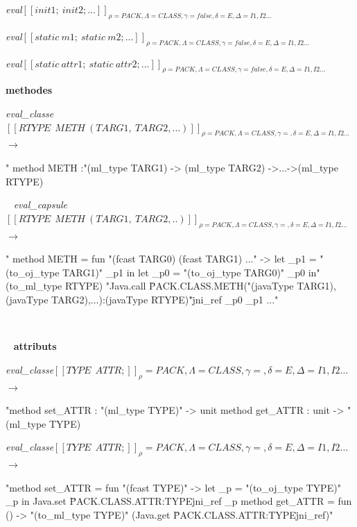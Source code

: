 \documentclass[a4paper, 11pt]{article}
\begin{document}
    \emph{eval}$[\![init1;\ init2; ...]\!]_{\rho=PACK,\Lambda=CLASS,\gamma=false,\delta=E,\Delta=I1,I2... }$

    \emph{eval}$[\![static\ m1;\ static\ m2; ...]\!]_{\rho=PACK,\Lambda=CLASS,\gamma=false,\delta=E,\Delta=I1,I2... }$

\emph{eval}$[\![static\ attr1;\ static\ attr2; ...]\!]_{\rho=PACK,\Lambda=CLASS,\gamma=false,\delta=E,\Delta=I1,I2... }$

\newpage
\noindent
\textbf{ methodes } 


\noindent
\emph{eval\_classe}$[\![RTYPE\ \ METH\ (TARG1,\ TARG2, ...)]\!]_{ \rho=PACK,\Lambda=CLASS,\gamma=,\delta=E,\Delta=I1,I2...  }$$\longrightarrow$

\begin{OCaml}
  " method METH :"(ml_type TARG1) -> (ml_type TARG2) ->...->(ml_type RTYPE)
\end{OCaml}
\
\newline
\noindent
\emph{eval\_capsule}$[\![RTYPE\ \ METH\ (TARG1,\ TARG2,..)]\!]_{ \rho=PACK,\Lambda=CLASS,\gamma=,\delta=E,\Delta=I1,I2...  }$$\longrightarrow$

\begin{OCaml}
"      method METH =
         fun "(fcast TARG0) (fcast TARG1) ..." ->
           let _p1 = "(to_oj_type TARG1)" _p1 in
           let _p0 = "(to_oj_type TARG0)" _p0
           in"
             (to_ml_type RTYPE)
             "Java.call \"PACK.CLASS.METH("(javaType TARG1),(javaType TARG2),...):(javaType RTYPE)"\" jni_ref _p0 _p1 ..."
\end{OCaml}
\ 

\ 
\newline
\noindent
\textbf{ attributs }

\noindent
\emph{eval\_classe}$[\![ TYPE\ \ ATTR; ]\!]_\rho=PACK,\Lambda=CLASS,\gamma=,\delta=E,\Delta=I1,I2...{}$$\longrightarrow$

\begin{OCaml}
  "method set_ATTR : "(ml_type TYPE)" -> unit
   method get_ATTR : unit -> "(ml_type TYPE)
\end{OCaml}

\noindent
\emph{eval\_classe}$[\![ TYPE\ \ ATTR; ]\!]_\rho=PACK,\Lambda=CLASS,\gamma=,\delta=E,\Delta=I1,I2...{}$$\longrightarrow$

\begin{OCaml}
       "method set_ATTR =
           fun "(fcast TYPE)" ->
              let _p = "(to_oj_type TYPE)" _p
              in Java.set \"PACK.CLASS.ATTR:TYPE\" jni_ref _p
        method get_ATTR =
        fun () ->
           "(to_ml_type TYPE)" (Java.get \"PACK.CLASS.ATTR:TYPE\" jni_ref)"
\end{OCaml}
\end{document}
